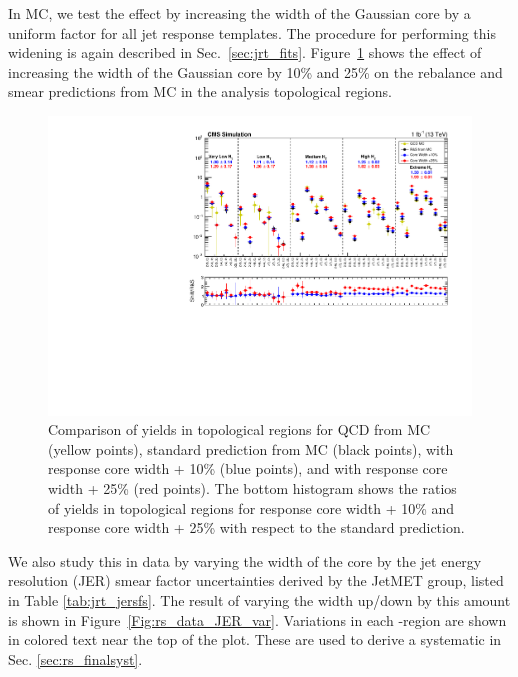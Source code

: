In MC, we test the effect by increasing the width of the Gaussian core by a uniform factor for all jet response templates. 
The procedure for performing this widening is again described in Sec.~\ref{sec:jrt_fits}. 
Figure~\ref{Fig:rs_modify_core} shows the effect of increasing the width of the Gaussian core by 10\% and 25\% on the rebalance and smear predictions from MC in the 
analysis topological regions.

\begin{figure}[ht]
  \begin{center}
    \includegraphics[width=1.0\textwidth]{figs/qcd/rs_mc/mc_coreWidth.pdf}
    \caption{Comparison of yields in topological regions for QCD from MC (yellow points), standard \rs prediction from MC (black points), \rs with response core width + 10\% (blue points), and
             \rs with response core width + 25\% (red points). The bottom histogram shows the ratios of yields in topological regions for response core width + 10\% and response core width + 25\%
             with respect to the standard \rs prediction.
            }
    \label{Fig:rs_modify_core}
  \end{center}
\end{figure}

We also study this in data by varying the width of the core by the jet energy resolution (JER) smear factor uncertainties derived by the JetMET group, listed in Table \ref{tab:jrt_jersfs}.
The result of varying the width up/down by this amount is shown in Figure~\ref{Fig:rs_data_JER_var}. Variations in each \Ht-region are shown in colored text near
the top of the plot. These are used to derive a systematic in Sec. \ref{sec:rs_finalsyst}.

